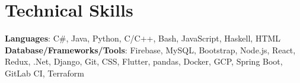 \documentclass[letterpaper,11pt]{article}
\begin{document}
\section{Technical Skills}
 \begin{itemize}[leftmargin=0.15in, label={}]
    \small{\item{
     \textbf{Languages}{: C\#, Java, Python, C/C++, Bash, JavaScript, Haskell, HTML} \\
     \textbf{Database/Frameworks/Tools}{: Firebase, MySQL, Bootstrap, Node.js, React, Redux, .Net, Django, Git, CSS, Flutter, pandas, Docker, GCP, Spring Boot, GitLab CI, Terraform} \\
    }}
 \end{itemize}


\end{document}
